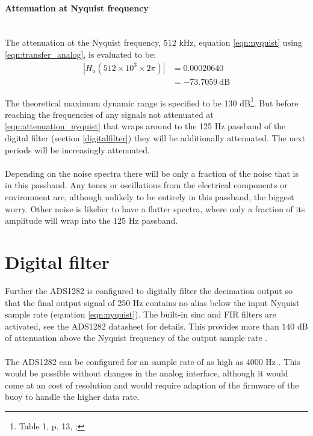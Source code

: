 \documentclass[a4paper]{article}
\begin{document}
\begin{multicols}{2}
\paragraph{Attenuation at Nyquist frequency}\ \\
The attenuation at the Nyquist
frequency, $512$ kHz, equation \eqref{eqn:nyquist} using
\eqref{eqn:transfer_analog}, is evaluated to be:
\begin{equation}
  \begin{aligned}
  | H_a(512 \times 10^3 \times 2 \pi) | &= 0.00020640 \\
                                        &= -73.7059\ \text{dB}
  \end{aligned}
  \label{eqn:attenuation_nyquist}
\end{equation}

The theoretical maximum dynamic range is specified to be 130
dB\footnote{Table 1, p. 13, \cite{ads1282_ds}; }.
But before reaching the frequencies of any signals not attenuated at
\eqref{eqn:attenuation_nyquist} that wraps around to the 125 Hz passband of
the digital filter (section \ref{digitalfilter}) they will be additionally
attenuated. The next periods will be increasingly attenuated.
\paragraph{} Depending on the noise spectra there will
be only a fraction of the noise that is in this passband. Any tones or
oscillations from the electrical components or environment are, although
unlikely to be entirely in this passband, the biggest worry. Other noise
is likelier to have a flatter spectra, where only a fraction of its
amplitude will wrap into the 125 Hz passband.


\label{digitalfilter}
\section{Digital filter}
Further the ADS1282 is configured to digitally filter the decimation
output so that the final output signal of 250 Hz contains no alias below
the input Nyquist sample rate (equation \eqref{eqn:nyquist}). The
built-in sinc and FIR filters are activated, see the ADS1282 datasheet
\cite{ads1282_ds} for details. This provides more
than $140$ dB of attenuation above the Nyquist frequency of the output
sample rate \cite{ads1282_ds}.
\paragraph{}The
ADS1282 can be configured for an sample rate of as high as 4000 Hz
\cite{ads1282_ds}. This would be possible without changes in the analog
interface, although it would come at an cost of resolution and would
require adaption of the firmware of the buoy to handle the higher data
rate.


\end{multicols}
\end{document}
